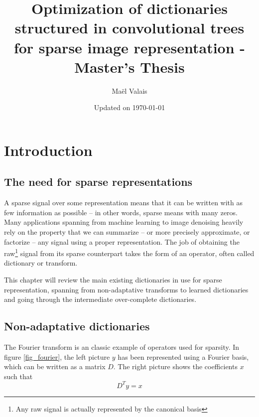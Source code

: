 


\author{Maël Valais}
\date{Updated on \today}
\title{Optimization of dictionaries structured in convolutional trees for sparse image representation - Master's Thesis}

\tableofcontents

\chapter{Introduction}

\section{The need for sparse representations}

A sparse signal over some representation means that it can be written with as few information as possible – in other words, sparse means with many zeros. Many applications spanning from machine learning to image denoising heavily rely on the property that we can summarize – or more precisely approximate, or factorize – any signal using a proper representation. The job of obtaining the raw\footnote{Any raw signal is actually represented by the canonical basis} signal from its sparse counterpart takes the form of an operator, often called dictionary or transform.

This chapter will review the main existing dictionaries in use for sparse representation, spanning from non-adaptative transforms to learned dictionaries and going through the intermediate over-complete dictionaries.

\section{Non-adaptative dictionaries}

The Fourier transform is an classic example of operators used for sparsity. In figure \ref{fig_fourier}, the left picture $y$ has been represented using a Fourier basis, which can be written as a matrix $D$. The right picture shows the coefficients $x$ such that
$$D^Ty = x$$


